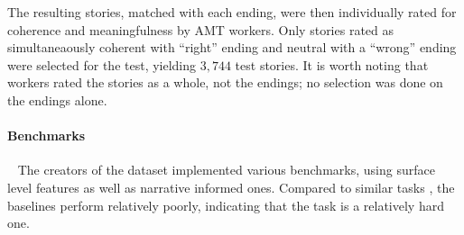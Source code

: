 \documentclass[11pt,a4paper]{article}
\newcommand{\ms}[1]{{\color{cyan}\{\textit{#1}\}$_{ms}$}}
\newcommand{\roy}[1]{\footnote{\color{red}{\textbf{Roy: #1}}}}
\renewcommand{\ms}[1]{}
\renewcommand{\roy}[1]{}
\begin{document}
The resulting stories, matched with each ending, were then individually rated for coherence and meaningfulness by AMT workers. Only stories rated as simultaneaously coherent with ``right'' ending and neutral with a ``wrong'' ending were selected for the test, yielding $3,744$ test stories. It is worth noting that workers rated the stories as a whole, not the endings; no selection was done on the endings alone.

\paragraph{Benchmarks}
~\ms{Like you said, maybe this belongs in related work, but for now I'll put it here}
The creators of the dataset implemented various benchmarks, using surface level features as well as narrative informed ones. Compared to similar tasks \cite{CNN, SQUAD, SNLI}, the baselines perform relatively poorly, indicating that the task is a relatively hard one. 
\end{document}
